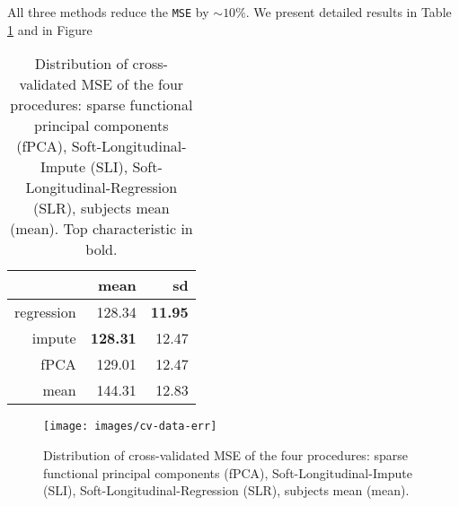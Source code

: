 \documentclass[preprint]{imsart}
\numberwithin{equation}{section}
\theoremstyle{plain}
\DeclareMathOperator*{\diag}{diag}
\begin{document}
All three methods reduce the \verb|MSE| by $\sim 10\%$. We present detailed results in Table \ref{tbl:data-res} and in Figure

\begin{table}[ht]
\centering
\begin{tabular}{rrr}
  \hline
 & mean & sd \\ 
  \hline
regression & 128.34 & \textbf{11.95} \\ 
  impute & \textbf{128.31} & 12.47 \\ 
  fPCA & 129.01 & 12.47 \\ 
  mean & 144.31 & 12.83 \\ 
   \hline
\end{tabular}\label{tbl:data-res}
\caption{Distribution of cross-validated MSE of the four procedures: sparse functional principal components (fPCA), Soft-Longitudinal-Impute (SLI), Soft-Longitudinal-Regression (SLR), subjects mean (mean). Top characteristic in bold.}
\end{table}

\begin{figure}[h]
  \texttt{[image: images/cv-data-err]}
  \caption{Distribution of cross-validated MSE of the four procedures: sparse functional principal components (fPCA), Soft-Longitudinal-Impute (SLI), Soft-Longitudinal-Regression (SLR), subjects mean (mean).}
  \label{fig:Boxplots}
\end{figure}




\end{document}
